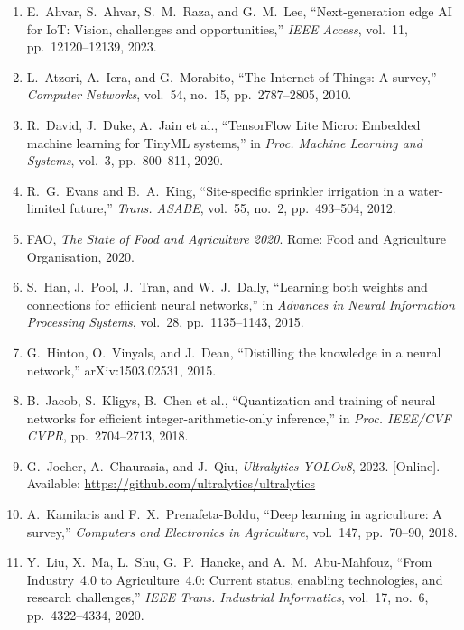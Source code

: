 \documentclass[12pt,a4paper]{report}
\begin{document}
\begin{enumerate}
    \item E.~Ahvar, S.~Ahvar, S.~M.~Raza, and G.~M.~Lee, ``Next-generation edge AI for IoT: Vision, challenges and opportunities,'' \textit{IEEE Access}, vol.~11, pp.~12120--12139, 2023.

    \item L.~Atzori, A.~Iera, and G.~Morabito, ``The Internet of Things: A survey,'' \textit{Computer Networks}, vol.~54, no.~15, pp.~2787--2805, 2010.

    \item R.~David, J.~Duke, A.~Jain et al., ``TensorFlow Lite Micro: Embedded machine learning for TinyML systems,'' in \textit{Proc. Machine Learning and Systems}, vol.~3, pp.~800--811, 2020.

    \item R.~G.~Evans and B.~A.~King, ``Site-specific sprinkler irrigation in a water-limited future,'' \textit{Trans. ASABE}, vol.~55, no.~2, pp.~493--504, 2012.

    \item FAO, \textit{The State of Food and Agriculture 2020}. Rome: Food and Agriculture Organisation, 2020.

    \item S.~Han, J.~Pool, J.~Tran, and W.~J.~Dally, ``Learning both weights and connections for efficient neural networks,'' in \textit{Advances in Neural Information Processing Systems}, vol.~28, pp.~1135--1143, 2015.

    \item G.~Hinton, O.~Vinyals, and J.~Dean, ``Distilling the knowledge in a neural network,'' arXiv:1503.02531, 2015.

    \item B.~Jacob, S.~Kligys, B.~Chen et al., ``Quantization and training of neural networks for efficient integer-arithmetic-only inference,'' in \textit{Proc. IEEE/CVF CVPR}, pp.~2704--2713, 2018.

    \item G.~Jocher, A.~Chaurasia, and J.~Qiu, \textit{Ultralytics YOLOv8}, 2023. [Online]. Available: \url{https://github.com/ultralytics/ultralytics}

    \item A.~Kamilaris and F.~X.~Prenafeta-Boldu, ``Deep learning in agriculture: A survey,'' \textit{Computers and Electronics in Agriculture}, vol.~147, pp.~70--90, 2018.

    \item Y.~Liu, X.~Ma, L.~Shu, G.~P.~Hancke, and A.~M.~Abu-Mahfouz, ``From Industry~4.0 to Agriculture~4.0: Current status, enabling technologies, and research challenges,'' \textit{IEEE Trans. Industrial Informatics}, vol.~17, no.~6, pp.~4322--4334, 2020.


\end{enumerate}
\end{document}
